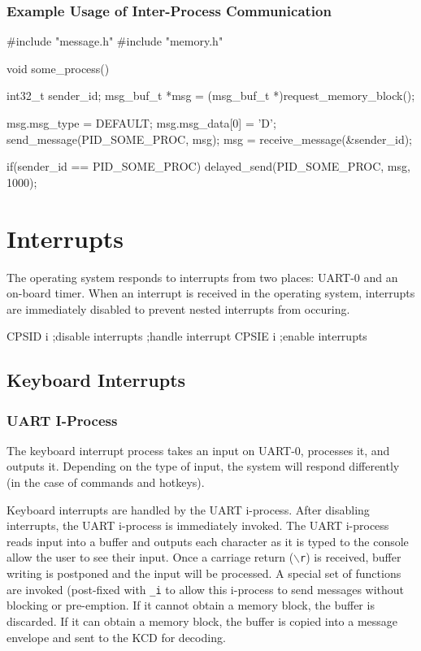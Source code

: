 \documentclass[se]{uw-wkrpt}
\begin{document}
\subsubsection{Example Usage of Inter-Process Communication}

\begin{code}
#include "message.h"
#include "memory.h"

void some_process() {
	int32_t sender_id;
	msg_buf_t *msg = (msg_buf_t *)request_memory_block();
	
	msg.msg_type = DEFAULT;
	msg.msg_data[0] = 'D';
	send_message(PID_SOME_PROC, msg);
	msg = receive_message(&sender_id);
	
	if(sender_id == PID_SOME_PROC) {
		delayed_send(PID_SOME_PROC, msg, 1000);
	}
}
\end{code}

\section{Interrupts}\label{sec:interupt}

The operating system responds to interrupts from two places: UART-0 and an on-board timer. When an interrupt is received in the operating system, interrupts are immediately disabled to prevent nested interrupts from occuring. 

\begin{code}
CPSID i                        ;disable interrupts
;handle interrupt
CPSIE i                         ;enable interrupts
\end{code}

\subsection{Keyboard Interrupts} \label{sec:uart}

\subsubsection{UART I-Process}

The keyboard interrupt process takes an input on UART-0, processes it, and outputs it. Depending on the type of input, the system will respond differently (in the case of commands and hotkeys).

Keyboard interrupts are handled by the UART i-process. After disabling interrupts, the UART i-process is immediately invoked. The UART i-process reads input into a buffer and outputs each character as it is typed to the console allow the user to see their input. Once a carriage return (\texttt{$\backslash$r}) is received, buffer writing is postponed and the input will be processed. A special set of functions are invoked (post-fixed with \texttt{\_i} to allow this i-process to send messages without blocking or pre-emption. If it cannot obtain a memory block, the buffer is discarded. If it can obtain a memory block, the buffer is copied into a message envelope and sent to the KCD for decoding. 
\end{document}
